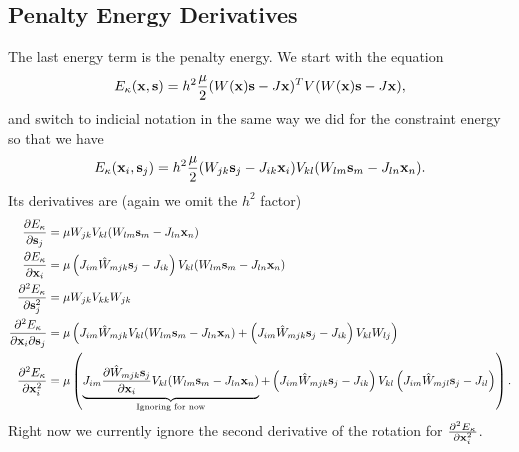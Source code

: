 \subsection{Penalty Energy Derivatives}
The last energy term is the penalty energy. We start with the  equation
\begin{equation}
E_\kappa(\mathbf{x},\mathbf{s}) = h^2 \frac{\mu}{2} (W(\mathbf{x})\mathbf{s} - J\mathbf{x})^T V (W(\mathbf{x})\mathbf{s} - J\mathbf{x}),
\end{equation}
and switch to indicial notation in the same way we did for the constraint energy so that we have
\begin{equation}
E_\kappa(\mathbf{x}_i,\mathbf{s}_j) = h^2 \frac{\mu}{2} (W_{jk}\mathbf{s}_j - J_{ik}\mathbf{x}_i) V_{kl} (W_{lm}\mathbf{s}_m - J_{ln}\mathbf{x}_n).
\end{equation}
Its derivatives are (again we omit the $h^2$ factor)
\begin{align}
\frac{\partial E_\kappa}{\partial \mathbf{s}_j} &= \mu W_{jk} V_{kl} (W_{lm}\mathbf{s}_m - J_{ln}\mathbf{x}_n) \\
\frac{\partial E_\kappa}{\partial \mathbf{x}_i} &= \mu \left(J_{im}\hat{W}_{mjk}\mathbf{s}_j - J_{ik}\right) V_{kl} (W_{lm}\mathbf{s}_m - J_{ln}\mathbf{x}_n)  \\
\frac{\partial^2 E_\kappa}{\partial \mathbf{s}_j^2} &= \mu W_{jk} V_{kk} W_{jk} \\
\frac{\partial^2 E_\kappa}{\partial \mathbf{x}_i \partial \mathbf{s}_j} &= \mu \left( 
	J_{im}\hat{W}_{mjk}V_{kl} (W_{lm}\mathbf{s}_m - J_{ln}\mathbf{x}_n)	
  + \left(J_{im}\hat{W}_{mjk}\mathbf{s}_j - J_{ik}\right) V_{kl} W_{lj}
   \right)\\
\frac{\partial^2 E_\kappa}{\partial \mathbf{x}^2_i} &= \mu \left( 
	\underbrace{
		J_{im} \frac{\partial \hat{W}_{mjk} \mathbf{s}_j}{\partial \mathbf{x}_i} V_{kl} (W_{lm}\mathbf{s}_m - J_{ln}\mathbf{x}_n)	
		}_\text{Ignoring for now}
  + \left(J_{im}\hat{W}_{mjk}\mathbf{s}_j - J_{ik}\right) V_{kl} \left( J_{im}\hat{W}_{mjl}\mathbf{s}_j - J_{il}\right)
   \right).
\end{align}
Right now we currently ignore the second derivative of the rotation for $\frac{\partial^2 E_\kappa}{\partial \mathbf{x}^2_i}$.
